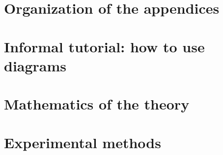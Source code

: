     
    
    \appendix

    \newpage
    \section*{Organization of the appendices}
        
    \newpage

    \section{Informal tutorial: how to use diagrams}\label{appendix:tutorial}
        
    
    \section{Mathematics of the theory}\label{appendix:math}
        
    
    \section{Experimental methods}\label{appendix:experiments}
        
    


